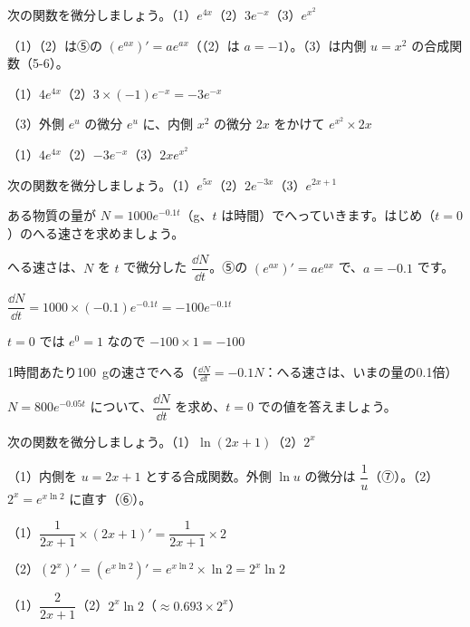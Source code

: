 \begin{reidai}[$e$ をふくむ関数の微分]
次の関数を微分しましょう。\quad（1）$e^{4x}$\quad（2）$3e^{-x}$\quad（3）$e^{x^2}$\par
\kangaekata（1）（2）は⑤の $(e^{ax})'=ae^{ax}$（（2）は $a=-1$）。（3）は内側 $u=x^2$ の合成関数（5-6）。\par
\shiki（1）$4e^{4x}$\quad（2）$3\times(-1)e^{-x}=-3e^{-x}$\par
\hspace*{2.6\zw}（3）外側 $e^u$ の微分 $e^u$ に、内側 $x^2$ の微分 $2x$ をかけて $e^{x^2}\times2x$\par
\kotae （1）$4e^{4x}$\quad（2）$-3e^{-x}$\quad（3）$2xe^{x^2}$
\end{reidai}

\begin{jibun}
次の関数を微分しましょう。\quad（1）$e^{5x}$\quad（2）$2e^{-3x}$\quad（3）$e^{2x+1}$
\end{jibun}

\begin{reidai}[へる速さ]
ある物質の量が $N=1000e^{-0.1t}$（g、$t$ は時間）でへっていきます。はじめ（$t=0$）のへる速さを求めましょう。\par
\kangaekata へる速さは、$N$ を $t$ で微分した $\dfrac{\dd N}{\dd t}$。⑤の $(e^{ax})'=ae^{ax}$ で、$a=-0.1$ です。\par
\shiki $\dfrac{\dd N}{\dd t}=1000\times(-0.1)e^{-0.1t}=-100e^{-0.1t}$\par
\hspace*{2.6\zw}$t=0$ では $e^0=1$ なので $-100\times1=-100$\par
\kotae 1時間あたり\qty{100}{g}の速さでへる（$\frac{\dd N}{\dd t}=-0.1N$：へる速さは、いまの量の0.1倍）
\end{reidai}

\begin{jibun}
$N=800e^{-0.05t}$ について、$\dfrac{\dd N}{\dd t}$ を求め、$t=0$ での値を答えましょう。
\end{jibun}

\begin{reidai}[$\ln$ と $a^x$ の微分]
次の関数を微分しましょう。\quad（1）$\ln(2x+1)$\quad（2）$2^x$\par
\kangaekata（1）内側を $u=2x+1$ とする合成関数。外側 $\ln u$ の微分は $\dfrac{1}{u}$（⑦）。（2）$2^x=e^{x\ln2}$ に直す（⑥）。\par
\shiki（1）$\dfrac{1}{2x+1}\times(2x+1)'=\dfrac{1}{2x+1}\times2$\par
\hspace*{2.6\zw}（2）$(2^x)'=(e^{x\ln2})'=e^{x\ln2}\times\ln2=2^x\ln2$\par
\kotae （1）$\dfrac{2}{2x+1}$\quad（2）$2^x\ln2$（$\approx0.693\times2^x$）
\end{reidai}

